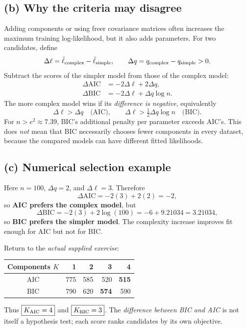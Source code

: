 \subsection*{(b) Why the criteria may disagree}
Adding components or using freer covariance matrices often increases the maximum training log-likelihood, but it also adds parameters. For two candidates, define
\[
\Delta\ell=\hat\ell_{\rm complex}-\hat\ell_{\rm simple},\qquad
\Delta q=q_{\rm complex}-q_{\rm simple}>0.
\]
Subtract the scores of the simpler model from those of the complex model:
\[
\begin{aligned}
\Delta\mathrm{AIC}&=-2\Delta\ell+2\Delta q,\\
\Delta\mathrm{BIC}&=-2\Delta\ell+\Delta q\log n.
\end{aligned}
\]
The more complex model wins if its \emph{difference is negative}, equivalently
\[
\boxed{\Delta\ell>\Delta q\quad\text{(AIC)},\qquad
\Delta\ell>\tfrac12\Delta q\log n\quad\text{(BIC)}.}
\]
For $n>e^2\approx7.39$, BIC's additional penalty per parameter exceeds AIC's. This does \emph{not} mean that BIC necessarily chooses fewer components in every dataset, because the compared models can have different fitted likelihoods.

\subsection*{(c) Numerical selection example}
Here $n=100$, $\Delta q=2$, and $\Delta\ell=3$. Therefore
\[
\Delta\mathrm{AIC}=-2(3)+2(2)=\boxed{-2},
\]
so \textbf{AIC prefers the complex model}, but
\[
\Delta\mathrm{BIC}=-2(3)+2\log(100)
=-6+9.21034=\boxed{3.21034},
\]
so \textbf{BIC prefers the simpler model}. The complexity increase improves fit enough for AIC but not for BIC.

Return to the \emph{actual supplied exercise}:
\begin{center}\small
\begin{tabular}{@{}crrrr@{}}\toprule
Components $K$ & 1 & 2 & 3 & 4\\\midrule
AIC & 775 & 585 & 520 & \textbf{515}\\
BIC & 790 & 620 & \textbf{574} & 590\\\bottomrule
\end{tabular}
\end{center}
Thus $\boxed{K_{\rm AIC}=4}$ and $\boxed{K_{\rm BIC}=3}$. The \emph{difference between BIC and AIC} is not itself a hypothesis test; each score ranks candidates by its own objective.

